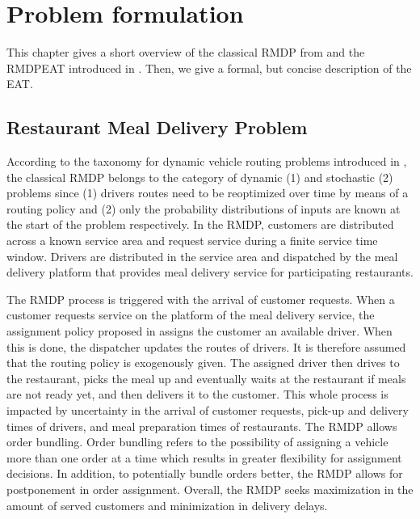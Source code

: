 \chapter{Problem formulation}

This chapter gives a short overview of the classical RMDP from \cite{UlmerRMDP} and the RMDPEAT introduced in \cite{Hildebrandt2020_EAT}. Then, we give a formal, but concise description of the EAT.
\section{Restaurant Meal Delivery Problem}

According to the taxonomy for dynamic vehicle routing problems introduced in \cite{psaraftis}, the classical RMDP belongs to the category of dynamic (1) and stochastic (2) problems since (1) drivers routes need to be reoptimized over time by means of a routing policy and (2) only the probability distributions of inputs are known at the start of the problem respectively. In the RMDP, customers are distributed across a known service area and request service during a finite service time window. Drivers are distributed in the service area and dispatched by the meal delivery platform that provides meal delivery service for participating restaurants. 

The RMDP process is triggered with the arrival of customer requests. When a customer requests service on the platform of the meal delivery service, the assignment policy proposed in \cite{UlmerRMDP} assigns the customer an available driver. When this is done, the dispatcher updates the routes of drivers. It is therefore assumed that the routing policy is exogenously given. The assigned driver then drives to the restaurant, picks the meal up and eventually waits at the restaurant if meals are not ready yet, and then delivers it to the customer. This whole process is impacted by uncertainty in the arrival of customer requests, pick-up and delivery times of drivers, and meal preparation times of restaurants.
The RMDP allows order bundling. Order bundling refers to the possibility of assigning a vehicle more than one order at a time which results in greater flexibility for assignment decisions. In addition, to potentially bundle orders better, the RMDP allows for postponement in order assignment.
Overall, the RMDP seeks maximization in the amount of served customers and minimization in delivery delays. 

